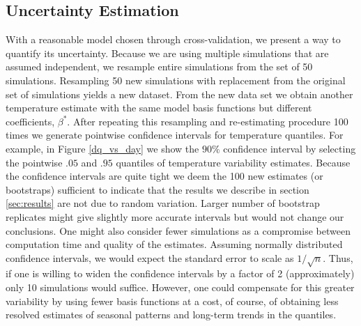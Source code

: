 \documentclass{ametsoc}
\begin{document}
\subsection{Uncertainty Estimation}
\label{app:uq}
With a reasonable model chosen through cross-validation, we present a way to quantify its uncertainty. Because we are using multiple simulations that are assumed independent, we resample entire simulations from the set of 50 simulations. Resampling 50 new simulations with replacement from the original set of simulations yields a new dataset. From the new data set we obtain another temperature estimate with the same model basis functions but different coefficients, $\beta^{\ast}$. After repeating this resampling and re-estimating procedure 100 times we generate pointwise confidence intervals for temperature quantiles. For example, in Figure \ref{dq_vs_day} we show the $90\%$ confidence interval by selecting the pointwise $.05$ and $.95$ quantiles of temperature variability estimates. Because the confidence intervals are quite tight we deem the 100 new estimates (or bootstraps) sufficient to indicate that the results we describe in section \ref{sec:results} are not due to random variation. Larger number of bootstrap replicates might give slightly more accurate intervals but would not change our conclusions. One might also consider fewer simulations as a compromise between computation time and quality of the estimates. Assuming normally distributed confidence intervals, we would expect the standard error to scale as $1/\sqrt{n}$. Thus, if one is willing to widen the confidence intervals by a factor of 2 (approximately) only 10 simulations would suffice. However, one could compensate for this greater variability by using fewer basis functions at a cost, of course, of obtaining less resolved estimates of seasonal patterns and long-term trends in the quantiles.




\end{document}
